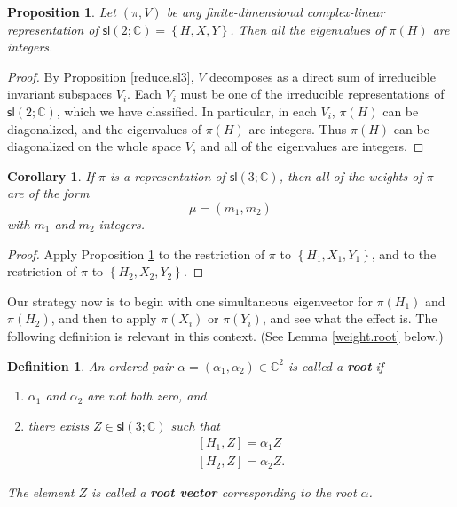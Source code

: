 \documentclass{amsbook}
\theoremstyle{plain}
\newtheorem{corollary}[theorem]{Corollary}
\newtheorem{definition}[theorem]{Definition}
\newtheorem{proposition}[theorem]{Proposition}
\numberwithin{equation}{chapter}
\numberwithin{theorem}{chapter}
\begin{document}
\begin{proposition}
\label{sl2.integer}Let $\left(  \pi,V\right)  $ be any finite-dimensional
complex-linear representation of $\mathsf{sl}(2;\mathbb{C})=\left\{
H,X,Y\right\}  $. Then all the eigenvalues of $\pi(H)$ are integers.
\end{proposition}

\begin{proof}
By Proposition \ref{reduce.sl3}, $V$ decomposes as a direct sum of irreducible
invariant subspaces $V_{i}$. Each $V_{i}$ must be one of the irreducible
representations of $\mathsf{sl}(2;\mathbb{C})$, which we have classified. In
particular, in each $V_{i}$, $\pi(H)$ can be diagonalized, and the eigenvalues
of $\pi(H)$ are integers. Thus $\pi(H)$ can be diagonalized on the whole space
$V$, and all of the eigenvalues are integers.
\end{proof}

\begin{corollary}
If $\pi$ is a representation of $\mathsf{sl}\left(  3;\mathbb{C}\right)  $,
then all of the weights of $\pi$ are of the form
\[
\mu=(m_{1},m_{2})
\]
with $m_{1}$ and $m_{2}$ integers.
\end{corollary}

\begin{proof}
Apply Proposition \ref{sl2.integer} to the restriction of $\pi$ to $\left\{
H_{1},X_{1},Y_{1}\right\}  $, and to the restriction of $\pi$ to $\left\{
H_{2},X_{2},Y_{2}\right\}  $.
\end{proof}

Our strategy now is to begin with one simultaneous eigenvector for $\pi(H_{1})
$ and $\pi(H_{2})$, and then to apply $\pi(X_{i})$ or $\pi(Y_{i})$, and see
what the effect is. The following definition is relevant in this context. (See
Lemma \ref{weight.root} below.)

\begin{definition}
An ordered pair $\alpha=\left(  \alpha_{1},\alpha_{2}\right)  \in
\mathbb{C}^{2}$ is called a \textbf{root} if

\begin{enumerate}
\item $\alpha_{1}$ and $\alpha_{2}$ are not both zero, and

\item  there exists $Z\in\mathsf{sl}\left(  3;\mathbb{C}\right)  $ such that
\begin{align*}
\left[  H_{1},Z\right]  =\alpha_{1}Z\\
\left[  H_{2},Z\right]  =\alpha_{2}Z\text{.}%
\end{align*}
\end{enumerate}

The element $Z$ is called a \textbf{root vector} corresponding to the root
$\alpha$.
\end{definition}
\end{document}
